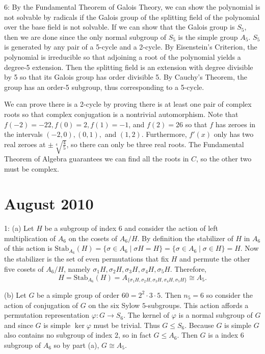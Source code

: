 \documentclass[12pt]{article}
\begin{document}
6: By the Fundamental Theorem of Galois Theory, we can show the polynomial is not solvable by radicals if the Galois group of the splitting field of the polynomial over the base field is not solvable. If we can show that the Galois group is $S_5$, then we are done since the only normal subgroup of $S_5$ is the simple group $A_5$. $S_5$ is generated by any pair of a 5-cycle and a 2-cycle. By Eisenstein's Criterion, the polynomial is irreducible so that adjoining a root of the polynomial yields a degree-5 extension. Then the splitting field is an extension with degree divisible by 5 so that its Galois group has order divisible 5. By Cauchy's Theorem, the group has an order-5 subgroup, thus corresponding to a 5-cycle. \newline

We can prove there is a 2-cycle by proving there is at least one pair of complex roots so that complex conjugation is a nontrivial automorphism. Note that $f(-2) = -22, f(0) = 2, f(1) = -1$, and $f(2) = 26$ so that $f$ has zeroes in the intervals $(-2,0),(0,1),$ and $(1,2)$. Furthermore, $f'(x)$ only has two real zeroes at $\pm \sqrt[4]{\frac{4}{5}}$, so there can only be three real roots. The Fundamental Theorem of Algebra guarantees we can find all the roots in $C$, so the other two must be complex.

\section{August 2010}
1: (a)  Let $H$ be a subgroup of index 6 and consider the action of left multiplication of $A_6$ on the cosets of $A_6/H$.  By definition the stabilizer of $H$ in $A_6$ of this action is $\text{Stab}_{A_6} (H) = \{\sigma \in A_6 \mid \sigma H = H\} = \{ \sigma \in A_6 \mid \sigma \in H\} = H$.  Now the stabilizer is the set of even permutations that fix $H$ and permute the other five cosets of $A_6/H$, namely $\sigma_1H, \sigma_2H, \sigma_3H, \sigma_4H,\sigma_5H$.  Therefore, $$H = \text{Stab}_{A_6} (H)= A_{\{\sigma_1H, \sigma_2H, \sigma_3H, \sigma_4H,\sigma_5H\}} \cong A_5.$$

(b)  Let $G$ be a simple group of order $60 = 2^2 \cdot 3 \cdot 5$.  Then $n_5 = 6$ so consider the action of conjugation of $G$ on the six Sylow $5$-subgroups.  This action affords a permutation representation $\varphi: G \to S_6$. The kernel of $\varphi$ is a normal subgroup of $G$ and since $G$ is simple $\ker \varphi$ must be trivial.  Thus $G \leq S_6$.  Because $G$ is simple $G$ also contains no subgroup of index $2$, so in fact $G \leq A_6$.  Then $G$ is a index $6$ subgroup of $A_6$ so by part (a), $G \cong A_5$. \newline
\end{document}
